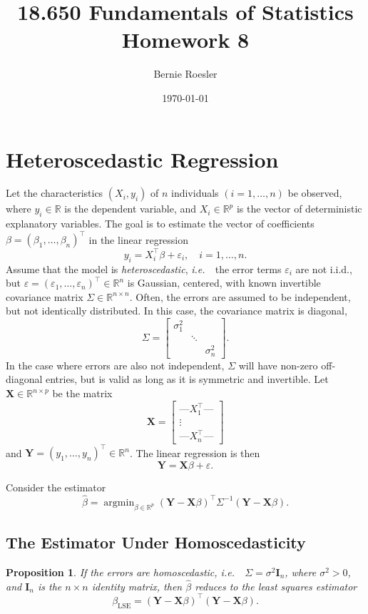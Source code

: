 \documentclass[letterpaper, reqno]{amsart}
\title[Homework 8 -- Problem \thesection]{18.650 Fundamentals of Statistics\\{\large Homework 8}}
\author{Bernie Roesler}
\date{\today}
\newtheorem{prop}{Proposition}[section]
\numberwithin{equation}{section}
\newcommand{\T}{\top} %
\newcommand{\vect}[1]{\boldsymbol{\mathbf{#1}}} %
\newcommand{\ie}{\emph{i.e.\ }}
\newcommand{\R}{\mathbb{R}}  %
\newcommand{\iid}{i.i.d.}
\newcommand{\Xm}{\vect{X}}
\newcommand{\Yv}{\vect{Y}}
\newcommand{\Bv}{\beta}
\newcommand{\Bvh}{\hat{\beta}}
\newcommand{\ve}{\varepsilon}
\DeclareMathOperator*{\argmin}{argmin}
\begin{document}
\graphicspath{{./figures/}}

\maketitle

\section{Heteroscedastic Regression}
Let the characteristics $(X_i, y_i)$ of $n$ individuals $(i = 1, \dots, n)$ be
observed, where $y_i \in \R$ is the dependent variable, and $X_i \in \R^p$ is
the vector of deterministic explanatory variables. The goal is to estimate the
vector of coefficients $\Bv = (\beta_1, \dots, \beta_n)^\T$ in the linear
regression
\[ y_i = X_i^\T \Bv + \ve_i, \quad i = 1, \dots, n. \]
Assume that the model is \emph{heteroscedastic}, \ie\ the error terms $\ve_i$
are not \iid, but $\ve = (\ve_1, \dots, \ve_n)^\T \in \R^n$ is Gaussian,
centered, with known invertible covariance matrix $\Sigma \in \R^{n \times n}$.
Often, the errors are assumed to be independent, but not identically
distributed. In this case, the covariance matrix is diagonal,
\[ \Sigma = \begin{bmatrix} \sigma_1^2 && \\ & \ddots & \\ && \sigma_n^2 \end{bmatrix}. \]
In the case where errors are also not independent, $\Sigma$ will have non-zero
off-diagonal entries, but is valid as long as it is symmetric and invertible. 
Let $\Xm \in \R^{n \times p}$ be the matrix
\[ \Xm = \begin{bmatrix} 
            \text{---} X_1^\T \text{---} \\
            \vdots \\ 
            \text{---} X_n^\T \text{---} 
          \end{bmatrix} 
\]
and $\Yv = (y_1, \dots, y_n)^\T \in \R^n$.
The linear regression is then
\[ \Yv = \Xm\Bv + \ve. \]

Consider the estimator
\[ \Bvh = \argmin_{\Bv \in \R^p} (\Yv - \Xm\Bv)^\T \Sigma^{-1} (\Yv - \Xm\Bv). \]

\subsection{The Estimator Under Homoscedasticity}
\begin{prop}
  If the errors are homoscedastic, \ie\ $\Sigma = \sigma^2 \vect{I}_n$, where $\sigma^2 > 0$, and
  $\vect{I}_n$ is the $n \times n$ identity matrix, then $\Bvh$ reduces to the least
  squares estimator
  \[ \beta_\mathrm{LSE} = (\Yv - \Xm\Bv)^\T(\Yv - \Xm\Bv). \]
\end{prop}
\end{document}
